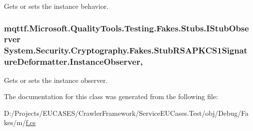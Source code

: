 Gets or sets the instance behavior.

\hypertarget{class_system_1_1_security_1_1_cryptography_1_1_fakes_1_1_stub_r_s_a_p_k_c_s1_signature_deformatter_a88728df211080650b634a1357ee8e88b}{
\subsubsection[{Instance\-Observer}]{\setlength{\rightskip}{0pt plus 5cm}mqttf.\-Microsoft.\-Quality\-Tools.\-Testing.\-Fakes.\-Stubs.\-I\-Stub\-Observer System.\-Security.\-Cryptography.\-Fakes.\-Stub\-R\-S\-A\-P\-K\-C\-S1\-Signature\-Deformatter.\-Instance\-Observer\hspace{0.3cm}{\ttfamily [get]}, {\ttfamily [set]}}}\label{class_system_1_1_security_1_1_cryptography_1_1_fakes_1_1_stub_r_s_a_p_k_c_s1_signature_deformatter_a88728df211080650b634a1357ee8e88b}


Gets or sets the instance observer.



The documentation for this class was generated from the following file\-:\begin{DoxyCompactItemize}
\item 
D\-:/\-Projects/\-E\-U\-C\-A\-S\-E\-S/\-Crawler\-Framework/\-Service\-E\-U\-Cases.\-Test/obj/\-Debug/\-Fakes/m/\hyperlink{m_2f_8cs}{f.\-cs}\end{DoxyCompactItemize}
